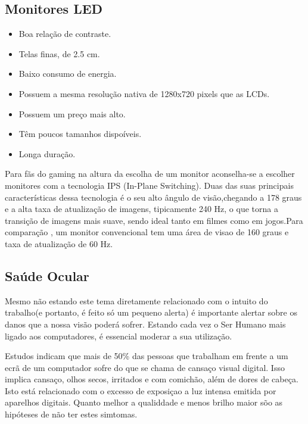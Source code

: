 \subsection{Monitores LED}
\begin{itemize}
	\item Boa relação de contraste.
	\item Telas finas, de 2.5 cm.
	\item Baixo consumo de energia.
	\item Possuem a mesma resolução nativa de 1280x720 pixels que as LCDs. 
	\item Possuem um preço mais alto.
	\item Têm poucos tamanhos dispoíveis.
	\item Longa duração.
\end{itemize}

Para fãs do gaming na altura da escolha de um monitor aconselha-se a escolher monitores com a tecnologia IPS (In-Plane Switching). Duas das suas principais características dessa tecnologia é o seu alto ângulo de visão,chegando a 178 graus e a alta taxa de atualização de imagens, tipicamente 240 Hz, o que torna a transição de imagens mais suave, sendo ideal tanto em filmes como em jogos.Para comparação , um monitor convencional  tem uma área de visao de 160 graus e taxa de atualização de 60 Hz.

\subsection{Saúde Ocular} 
Mesmo não estando este tema diretamente relacionado com o intuito do trabalho(e portanto, é feito só um pequeno alerta)  é importante alertar sobre os danos que a nossa visão poderá sofrer. Estando cada vez o Ser Humano mais ligado aos computadores, é essencial moderar a sua utilização.

Estudos indicam que mais de 50\% das pessoas que trabalham em frente a um ecrã de um computador sofre do que se chama de cansaço visual digital. Isso implica cansaço, olhos secos, irritados e com comichão, além de dores de cabeça. Isto está relacionado com o excesso de exposiçao a luz intensa emitida por aparelhos digitais. Quanto melhor a qualiddade e menos brilho maior sõo as hipóteses de não ter estes simtomas. 
 

